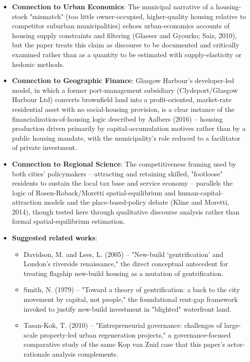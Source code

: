 \begin{itemize}
  \item \textbf{Connection to Urban Economics}: The municipal narrative of a housing-stock "mismatch" (too little owner-occupied, higher-quality housing relative to competitor suburban municipalities) echoes urban-economics accounts of housing supply constraints and filtering (Glaeser and Gyourko; Saiz, 2010), but the paper treats this claim as discourse to be documented and critically examined rather than as a quantity to be estimated with supply-elasticity or hedonic methods.
  \item \textbf{Connection to Geographic Finance}: Glasgow Harbour's developer-led model, in which a former port-management subsidiary (Clydeport/Glasgow Harbour Ltd) converts brownfield land into a profit-oriented, market-rate residential asset with no social-housing provision, is a clear instance of the financialization-of-housing logic described by Aalbers (2016) -- housing production driven primarily by capital-accumulation motives rather than by a public housing mandate, with the municipality's role reduced to a facilitator of private investment.
  \item \textbf{Connection to Regional Science}: The competitiveness framing used by both cities' policymakers -- attracting and retaining skilled, "footloose" residents to sustain the local tax base and service economy -- parallels the logic of Rosen-Roback/Moretti spatial-equilibrium and human-capital-attraction models and the place-based-policy debate (Kline and Moretti, 2014), though tested here through qualitative discourse analysis rather than formal spatial-equilibrium estimation.
  \item \textbf{Suggested related works}:
    \begin{itemize}
      \item Davidson, M. and Lees, L. (2005) -- "New-build `gentrification' and London's riverside renaissance," the direct conceptual antecedent for treating flagship new-build housing as a mutation of gentrification.
      \item Smith, N. (1979) -- "Toward a theory of gentrification: a back to the city movement by capital, not people," the foundational rent-gap framework invoked to justify new-build investment in "blighted" waterfront land.
      \item Tasan-Kok, T. (2010) -- "Entrepreneurial governance: challenges of large-scale property-led urban regeneration projects," a governance-focused comparative study of the same Kop van Zuid case that this paper's actor-rationale analysis complements.
    \end{itemize}
\end{itemize}

